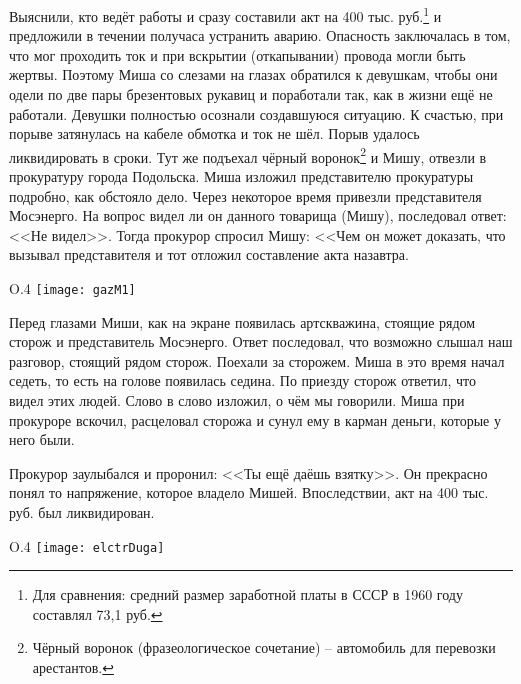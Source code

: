 Выяснили, кто ведёт работы и сразу составили акт на 400 тыс. руб.\footnote{Для сравнения: средний размер заработной платы в СССР в 1960 году составлял 73,1 руб.} и предложили в течении получаса устранить аварию. Опасность заключалась в том, что мог проходить ток и при вскрытии (откапывании) провода могли быть жертвы. Поэтому Миша со слезами на глазах обратился к девушкам, чтобы они одели по две пары брезентовых рукавиц и поработали так, как в жизни ещё не работали. Девушки полностью осознали создавшуюся ситуацию. К счастью, при порыве затянулась на кабеле обмотка и ток не шёл. Порыв удалось ликвидировать в сроки. Тут же подъехал чёрный воронок\footnote{Чёрный воронок (фразеологическое сочетание) \--- автомобиль для перевозки арестантов.} и Мишу, отвезли в прокуратуру города Подольска. Миша изложил представителю прокуратуры подробно, как обстояло дело. Через некоторое время привезли представителя Мосэнерго. На вопрос видел ли он данного товарища (Мишу), последовал ответ: <<Не видел>>. Тогда прокурор спросил Мишу: <<Чем он может доказать, что вызывал представителя и тот отложил составление акта назавтра.

\begin{wrapfigure}{O}{.4\textwidth}
\centering
\texttt{[image: gazM1]}
\caption[Чёрный воронок. Автомобиль ГАЗ-М\=/1 в Музее отечественной военной истории.]{Чёрный воронок. Автомобиль ГАЗ-М\=/1 в Музее отечественной военной истории\footnotemark.}
\label{fig:gazM1}
\end{wrapfigure}

Перед глазами Миши, как на экране появилась артскважина, стоящие рядом сторож и представитель Мосэнерго. Ответ последовал, что возможно слышал наш разговор, стоящий рядом сторож. Поехали за сторожем. Миша в это время начал седеть, то есть на голове появилась седина. По приезду сторож ответил, что видел этих людей. Слово в слово изложил, о чём мы говорили. Миша при прокуроре вскочил, расцеловал сторожа и сунул ему в карман деньги, которые у него были.

Прокурор заулыбался и проронил: <<Ты ещё даёшь взятку>>. Он прекрасно понял то напряжение, которое владело Мишей. Впоследствии, акт на 400 тыс. руб. был ликвидирован.

\begin{wrapfigure}{O}{.4\textwidth}
\centering
\texttt{[image: elctrDuga]}
\caption{Вольтова (электрическая) дуга.}
\label{fig:elctrDuga}
\end{wrapfigure}

